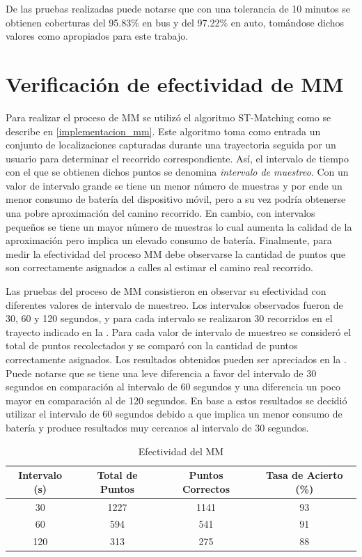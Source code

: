 De las pruebas realizadas puede notarse que con una tolerancia de 10 minutos se obtienen coberturas del 95.83\% en bus y del 97.22\% en auto, tomándose dichos valores como apropiados para este trabajo.

\section{Verificación de efectividad de MM}

Para realizar el proceso de MM se utilizó el algoritmo ST-Matching como se describe en \cref{implementacion_mm}. Este algoritmo toma como entrada un conjunto de localizaciones capturadas durante una trayectoria seguida por un usuario para determinar el recorrido correspondiente. Así, el intervalo de tiempo con el que se obtienen dichos puntos se denomina \emph{intervalo de muestreo}. Con un valor de intervalo grande se tiene un menor número de muestras y por ende un menor consumo de batería del dispositivo móvil, pero a su vez podría obtenerse una pobre aproximación del camino recorrido. En cambio, con intervalos pequeños se tiene un mayor número de muestras lo cual aumenta la calidad de la aproximación pero implica un elevado consumo de batería. Finalmente, para medir la efectividad del proceso MM debe observarse la cantidad de puntos que son correctamente asignados a calles al estimar el camino real recorrido.

Las pruebas del proceso de MM consistieron en observar su efectividad con diferentes valores de intervalo de muestreo. Los intervalos observados fueron de 30, 60 y 120 segundos, y para cada intervalo se realizaron 30 recorridos en el trayecto indicado en la . Para cada valor de intervalo de muestreo se consideró el total de puntos recolectados y se comparó con la cantidad de puntos correctamente asignados. Los resultados obtenidos pueden ser apreciados en la . Puede notarse que se tiene una leve diferencia a favor del intervalo de 30 segundos en comparación al intervalo de 60 segundos y una diferencia un poco mayor en comparación al de 120 segundos. En base a estos resultados se decidió utilizar el intervalo de 60 segundos debido a que implica un menor consumo de batería y produce resultados muy cercanos al intervalo de 30 segundos.

\begin{table}[h]
	\centering
	\begin{tabular}{cccc}
        \toprule
    	Intervalo (s) & Total de Puntos & Puntos Correctos & Tasa de Acierto (\%)\\
    	\midrule
    	30 & 1227  & 1141 & 93 \\
    	60 & 594 & 541 & 91 \\
    	120 & 313 & 275 & 88 \\ 
    	\bottomrule
	\end{tabular}
	\caption{Efectividad del MM} 
	\label{table:map_matching}
\end{table}

